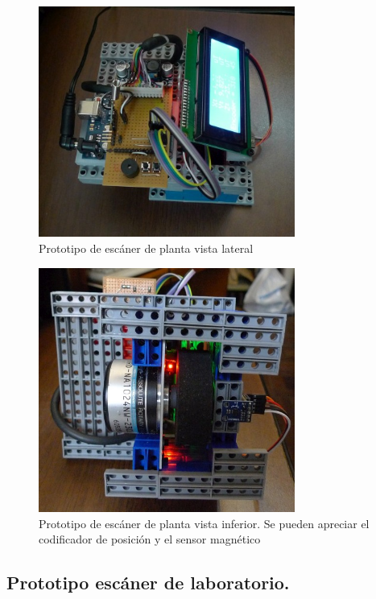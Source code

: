 \begin{figure}[H]
    \centering
    \includegraphics[width=0.75\textwidth]{./Figures/escanerManual02}
	\caption{Prototipo de escáner de planta vista lateral}
	\label{fig:escanerManual02}
 \end{figure}

\begin{figure}[H]
    \centering
    \includegraphics[width=0.75\textwidth]{./Figures/escanerManual03}
	\caption{Prototipo de escáner de planta vista inferior. Se pueden apreciar el codificador de posición y el sensor magnético}
	\label{fig:escanerManual03}
 \end{figure}



\subsection{Prototipo escáner de laboratorio.}

